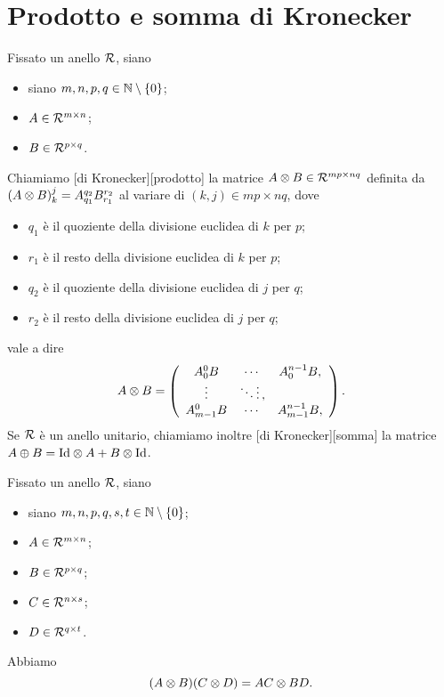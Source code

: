 \section{Prodotto e somma di Kronecker}
\label{Matrici_ProdottoESommaDiKronecker}
\begin{Definition}
  Fissato un anello $\mathcal{R}$, siano
  \begin{itemize}
    \item siano $m, n, p, q \in \mathbb{N} \setminus \lbrace 0 \rbrace$;
    \item $A \in \mathcal{R}^{m \times n}$;
    \item $B \in \mathcal{R}^{p \times q}$.
  \end{itemize}
  Chiamiamo
  [di Kronecker][prodotto]
  la matrice $A \otimes B \in \mathcal{R}^{mp \times nq}$ definita da
  $(A \otimes B)_k^j = A_{q_1}^{q_2} B_{r_1}^{r_2}$
  al variare di $(k,j) \in mp \times nq$, dove
  \begin{itemize}
    \item $q_1$ \`e il quoziente della divisione euclidea di $k$ per $p$;
    \item $r_1$ \`e il resto della divisione euclidea di $k$ per $p$;
    \item $q_2$ \`e il quoziente della divisione euclidea di $j$ per $q$;
    \item $r_2$ \`e il resto della divisione euclidea di $j$ per $q$;
  \end{itemize}
  vale a dire
  \[
    A \otimes B =
    \left (
    \begin{array}{ccc}
      A_0^0 B & \cdots & A_0^{n - 1} B,\\
      \vdots & \ddots \vdots,\\
      A_{m - 1}^0 B & \cdots & A_{m - 1}^{n - 1} B,\\
    \end{array}
    \right ).
  \]
  Se $\mathcal{R}$ \`e un anello unitario, chiamiamo inoltre
  [di Kronecker][somma]
  la matrice
  $A \KroneckerSum B
  = \Identity \KroneckerProduct A + B \KroneckerProduct \Identity$.
\end{Definition}
\begin{Theorem}
  Fissato un anello $\mathcal{R}$, siano
  \begin{itemize}
    \item siano $m, n, p, q, s, t \in \mathbb{N} \setminus \lbrace 0 \rbrace$;
    \item $A \in \mathcal{R}^{m \times n}$;
    \item $B \in \mathcal{R}^{p \times q}$;
    \item $C \in \mathcal{R}^{n \times s}$;
    \item $D \in \mathcal{R}^{q \times t}$.
  \end{itemize}
  Abbiamo
  \[
    (A \otimes B)(C \otimes D)
    = AC \otimes BD.
  \]
\end{Theorem}
